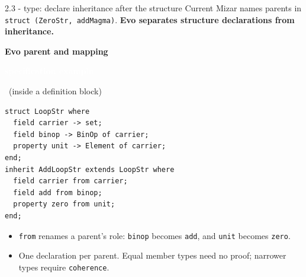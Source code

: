 \documentclass[aspectratio=169,11pt]{beamer}
\newcommand{\statusbadge}[2]{\colorbox{#1}{\textcolor{white}{\strut\scriptsize\sffamily\bfseries #2}}}
\newcommand{\badgeSpec}{\statusbadge{green!35!black}{specification example}}
\begin{document}
\begin{frame}[fragile,t]{2.3 - type: declare inheritance after the structure}
Current Mizar names parents in \texttt{struct (ZeroStr, addMagma)}. \textcolor{blue!55!black}{\textbf{Evo separates structure declarations from inheritance.}}

\smallskip
\textbf{Evo parent and mapping}~\badgeSpec~{\footnotesize(inside a definition block)}
\begin{lstlisting}[language={mizar},basicstyle=\ttfamily\footnotesize]
struct LoopStr where
  field carrier -> set;
  field binop -> BinOp of carrier;
  property unit -> Element of carrier;
end;
inherit AddLoopStr extends LoopStr where
  field carrier from carrier;
  field add from binop;
  property zero from unit;
end;
\end{lstlisting}
\begin{itemize}
\setlength{\itemsep}{1pt}
\setlength{\parsep}{0pt}
\setlength{\parskip}{0pt}
\item \texttt{from} renames a parent's role: \texttt{binop} becomes \texttt{add}, and \texttt{unit} becomes \texttt{zero}.
\item One declaration per parent. Equal member types need no proof; narrower types require \texttt{coherence}.
\end{itemize}
\end{frame}
\end{document}

